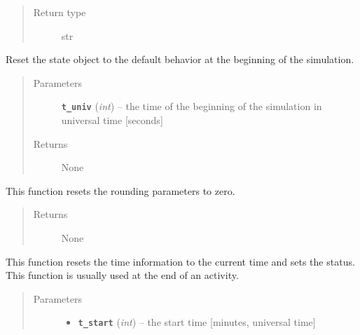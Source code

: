 \documentclass[letterpaper,10pt,english]{sphinxmanual}
\begin{document}
\begin{fulllineitems}
\begin{fulllineitems}
\begin{quote}
\begin{description}
\item[{Return type}] \leavevmode
str

\end{description}\end{quote}

\end{fulllineitems}


\begin{fulllineitems}
\label{state:state.State.reset}
Reset the state object to the default behavior at the beginning of the simulation.
\begin{quote}\begin{description}
\item[{Parameters}] \leavevmode
\textbf{\texttt{t\_univ}} (\emph{int}) -- the time of the beginning of the simulation in universal time {[}seconds{]}

\item[{Returns}] \leavevmode
None

\end{description}\end{quote}

\end{fulllineitems}


\begin{fulllineitems}
\label{state:state.State.reset_rounding_parameters}
This function resets the rounding parameters to zero.
\begin{quote}\begin{description}
\item[{Returns}] \leavevmode
None

\end{description}\end{quote}

\end{fulllineitems}


\begin{fulllineitems}
\label{state:state.State.reset_time_status}
This function resets the time information to the current time and         sets the status. This function is usually used at the end of an activity.
\begin{quote}\begin{description}
\item[{Parameters}] \leavevmode\begin{itemize}
\item {} 
\textbf{\texttt{t\_start}} (\emph{int}) -- the start time {[}minutes, universal time{]}


\end{itemize}
\end{description}
\end{quote}
\end{fulllineitems}
\end{fulllineitems}
\end{document}
